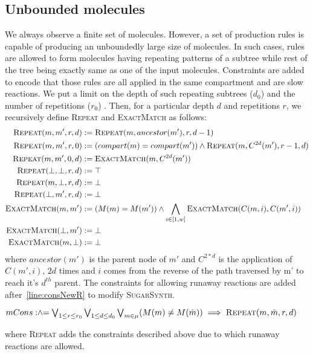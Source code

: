 \subsection{Unbounded molecules}
We always observe a finite set of molecules. However,
a set of production rules is capable of producing
an unboundedly large size of molecules. In such cases, rules are allowed to form molecules having repeating patterns of a subtree while rest of the tree being exactly same as one of the input molecules. Constraints are added to encode that those rules are all applied in the same compartment and are slow reactions. We put a limit on the depth of such repeating subtrees ($d_0$) and the number of repetitions ($r_0$) . Then, for a particular depth $d$ and repetitions $r$, we recursively define \textsc{Repeat} and \textsc{ExactMatch} as follows:
\begin{align*}
  \textsc{Repeat}(m, m', r, d) :=\;&  \textsc{Repeat}(m, ancestor(m'), r, d-1)\\
    \textsc{Repeat}(m, m', r, 0) :=\;& (compart(m) = compart(m')) \land \textsc{Repeat}(m, C^{2d}(m'), r-1, d) \\
    \textsc{Repeat}(m, m', 0, d) :=\;&  \textsc{ExactMatch}(m,C^{2d}(m')) \\
    \textsc{Repeat}(\bot, \bot, r, d) :=\;&  \top \\
    \textsc{Repeat}(m, \bot, r, d) :=\;&  \bot \\
    \textsc{Repeat}(\bot, m', r, d) :=\;&  \bot \\
    \textsc{ExactMatch}(m,m') :=\;& (M(m) = M(m')) \land \bigwedge_{i \in [1,w]} \textsc{ExactMatch}(C(m,i),C(m',i)) \\
    \textsc{ExactMatch}(\bot,m') :=\;& \bot \\
    \textsc{ExactMatch}(m,\bot) :=\;& \bot 
  \end{align*}
  where $ancestor(m')$ is the parent node of $m'$ and $C^{2*d}$ is the application of $C(m',i)$, $2d$ times and $i$ comes from the reverse of the path traversed by m' to reach it's $d^{th}$ parent.
The constraints for allowing runaway reactions are added after~\ref{line:consNewR} to modify \textsc{SugarSynth}.
\begin{algorithmic}[1]
  \vspace{1ex}
  \State $mCons \mathrel{:\hspace{-3pt}\land\hspace{-3pt}=} \bigvee_{1 \leq r \leq r_0} \bigvee_{1 \leq d \leq d_0} \bigvee_{m \in \mu} (M(m) \neq M(\hat{m})) \implies  \textsc{Repeat}(m, \hat{m}, r, d) $
  \vspace{1ex}
\end{algorithmic}
where \textsc{Repeat} adds the constraints described above due to which runaway reactions are allowed.


